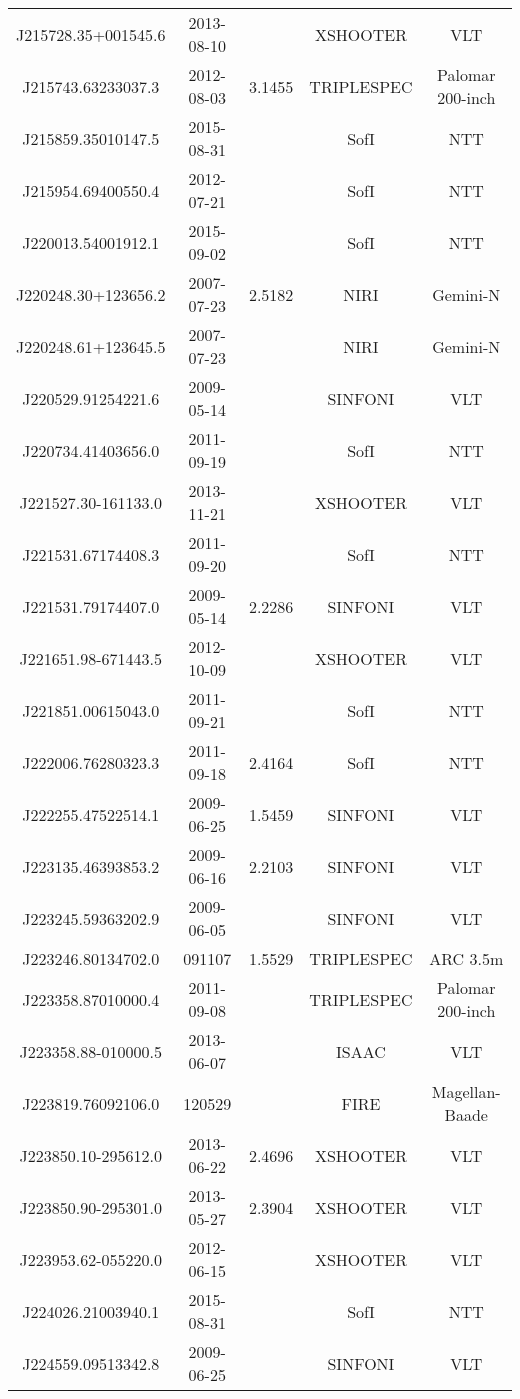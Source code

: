 {\begin{longtable}{ccccc}
J215728.35+001545.6 & 2013-08-10 &  & XSHOOTER & VLT \\
J215743.63233037.3 & 2012-08-03 & 3.1455 & TRIPLESPEC & Palomar 200-inch \\
J215859.35010147.5 & 2015-08-31 &  & SofI & NTT \\
J215954.69400550.4 & 2012-07-21 &  & SofI & NTT \\
J220013.54001912.1 & 2015-09-02 &  & SofI & NTT \\
J220248.30+123656.2 & 2007-07-23 & 2.5182 & NIRI & Gemini-N \\
J220248.61+123645.5 & 2007-07-23 &  & NIRI & Gemini-N \\
J220529.91254221.6 & 2009-05-14 &  & SINFONI & VLT \\
J220734.41403656.0 & 2011-09-19 &  & SofI & NTT \\
J221527.30-161133.0 & 2013-11-21 &  & XSHOOTER & VLT \\
J221531.67174408.3 & 2011-09-20 &  & SofI & NTT \\
J221531.79174407.0 & 2009-05-14 & 2.2286 & SINFONI & VLT \\
J221651.98-671443.5 & 2012-10-09 &  & XSHOOTER & VLT \\
J221851.00615043.0 & 2011-09-21 &  & SofI & NTT \\
J222006.76280323.3 & 2011-09-18 & 2.4164 & SofI & NTT \\
J222255.47522514.1 & 2009-06-25 & 1.5459 & SINFONI & VLT \\
J223135.46393853.2 & 2009-06-16 & 2.2103 & SINFONI & VLT \\
J223245.59363202.9 & 2009-06-05 &  & SINFONI & VLT \\
J223246.80134702.0 & 091107 & 1.5529 & TRIPLESPEC & ARC 3.5m \\
J223358.87010000.4 & 2011-09-08 &  & TRIPLESPEC & Palomar 200-inch \\
J223358.88-010000.5 & 2013-06-07 &  & ISAAC & VLT \\
J223819.76092106.0 & 120529 &  & FIRE & Magellan-Baade \\
J223850.10-295612.0 & 2013-06-22 & 2.4696 & XSHOOTER & VLT \\
J223850.90-295301.0 & 2013-05-27 & 2.3904 & XSHOOTER & VLT \\
J223953.62-055220.0 & 2012-06-15 &  & XSHOOTER & VLT \\
J224026.21003940.1 & 2015-08-31 &  & SofI & NTT \\
J224559.09513342.8 & 2009-06-25 &  & SINFONI & VLT \\

\end{longtable}}
